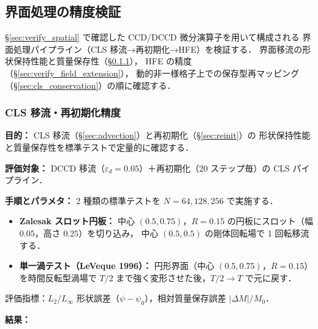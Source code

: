 %
\subsection{界面処理の精度検証}
\label{sec:verify_interface}

§\ref{sec:verify_spatial} で確認した CCD/DCCD 微分演算子を用いて構成される
界面処理パイプライン（CLS 移流→再初期化→HFE）を検証する．
界面移流の形状保持性能と質量保存性（§\ref{sec:verify_cls_advection}），
HFE の精度（§\ref{sec:verify_field_extension}），
動的非一様格子上での保存型再マッピング（§\ref{sec:cls_conservation}）の順に確認する．

\subsubsection{CLS 移流・再初期化精度}
\label{sec:verify_cls_advection}

\noindent\textbf{目的：}
CLS 移流（§\ref{sec:advection}）と再初期化（§\ref{sec:reinit}）の
形状保持性能と質量保存性を標準テストで定量的に確認する．

\noindent\textbf{評価対象：}
DCCD 移流（$\varepsilon_d = 0.05$）＋再初期化（20 ステップ毎）の CLS パイプライン．

\noindent\textbf{手順とパラメタ：}
2 種類の標準テストを $N = 64, 128, 256$ で実施する．
\begin{itemize}[noitemsep]
  \item[(a)] \textbf{Zalesak スロット円板：}
        中心 $(0.5, 0.75)$，$R = 0.15$ の円板にスロット（幅 $0.05$，高さ $0.25$）を切り込み，
        中心 $(0.5, 0.5)$ の剛体回転場で 1 回転移流する．
  \item[(b)] \textbf{単一渦テスト（LeVeque 1996）：}
        円形界面（中心 $(0.5, 0.75)$，$R = 0.15$）を時間反転型渦場で
        $T/2$ まで強く変形させた後，$T/2 \to T$ で元に戻す．
\end{itemize}
評価指標：$L_2$/$L_\infty$ 形状誤差（$\psi - \psi_0$），相対質量保存誤差 $|\Delta M|/M_0$．

\noindent\textbf{結果：}

